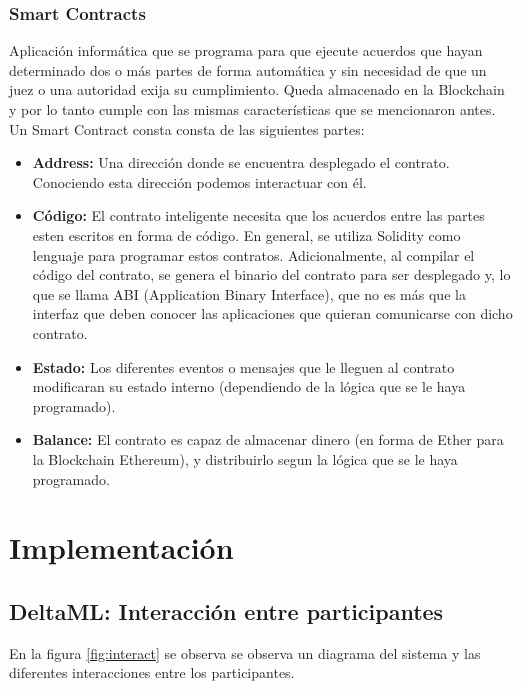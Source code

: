 \documentclass[
11pt, %
oneside, %
spanish, %
singlespacing, %
parskip, %
headsepline, %
chapterinoneline, %
]{MastersDoctoralThesis} %
\begin{document}
\subsection{Smart Contracts \cite{sc}}
Aplicación informática que se programa para que ejecute acuerdos que hayan determinado dos o más partes de forma automática y sin necesidad de que un juez o una autoridad exija su cumplimiento.
Queda almacenado en la Blockchain y por lo tanto cumple con las mismas características que se mencionaron antes.
Un Smart Contract consta consta de las siguientes partes:

\begin{itemize}
\item \textbf{Address:} Una dirección donde se encuentra desplegado el contrato. Conociendo esta dirección podemos interactuar con él.
\item \textbf{Código:} El contrato inteligente necesita que los acuerdos entre las partes esten escritos en forma de código. En general, se utiliza Solidity como lenguaje para programar estos contratos. Adicionalmente, al compilar el código del contrato, se genera el binario del contrato para ser desplegado y, lo que se llama ABI (Application Binary Interface), que no es más que la interfaz que deben conocer las aplicaciones que quieran comunicarse con dicho contrato.
\item \textbf{Estado:} Los diferentes eventos o mensajes que le lleguen al contrato modificaran su estado interno (dependiendo de la lógica que se le haya programado).
\item  \textbf{Balance:} El contrato es capaz de almacenar dinero (en forma de Ether para la Blockchain Ethereum), y distribuirlo segun la lógica que se le haya programado.
\end{itemize}


\newpage

\chapter{Implementación}

\section{DeltaML: Interacción entre participantes}
En la figura \ref{fig:interact} se observa se observa un diagrama del sistema y las diferentes interacciones entre los participantes.
\end{document}
